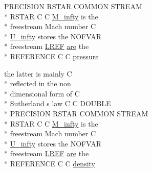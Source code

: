 \begin{DoxyCompactItemize}
P\-R\-E\-C\-I\-S\-I\-O\-N R\-S\-T\-A\-R C\-O\-M\-M\-O\-N S\-T\-R\-E\-A\-M \\*
R\-S\-T\-A\-R C C \hyperlink{msa20_2home_2abonfi_2_c_f_d__codes_2_eul_f_s_83_82_83_2include_2stream_8com_a57c765efd76d44669f6966962bda2d72}{M\-\_\-infty} is the \\*
freestream Mach number C \\*
\hyperlink{msa20_2home_2abonfi_2_c_f_d__codes_2_eul_f_s_83_82_83_2include_2stream_8com_a3306f725a42d6173548f0867aa4313ef}{U\-\_\-infty} stores the N\-O\-F\-V\-A\-R \\*
freestream \hyperlink{msa20_2home_2abonfi_2_c_f_d__codes_2_eul_f_s_83_82_83_2include_2stream_8com_a19d492a15feda819ed49e580c6a1568f}{L\-R\-E\-F} \hyperlink{msa20_2home_2abonfi_2_c_f_d__codes_2_eul_f_s_83_82_83_2include_2ibc8_8com_a7f7721a0bb3c1d35cfbfbcfd6efc1548}{are} the \\*
R\-E\-F\-E\-R\-E\-N\-C\-E C C \hyperlink{home_2abonfi_2_c_f_d__codes_2_eul_f_s_83_84_2include_2stream_8com_a0facbcffae9f2ce2b94119850b5fc3d3}{pressure}
\item 
the latter is mainly C \\*
reflected in the non \\*
dimensional form of C \\*
Sutherland s law C C D\-O\-U\-B\-L\-E \\*
P\-R\-E\-C\-I\-S\-I\-O\-N R\-S\-T\-A\-R C\-O\-M\-M\-O\-N S\-T\-R\-E\-A\-M \\*
R\-S\-T\-A\-R C C \hyperlink{msa20_2home_2abonfi_2_c_f_d__codes_2_eul_f_s_83_82_83_2include_2stream_8com_a57c765efd76d44669f6966962bda2d72}{M\-\_\-infty} is the \\*
freestream Mach number C \\*
\hyperlink{msa20_2home_2abonfi_2_c_f_d__codes_2_eul_f_s_83_82_83_2include_2stream_8com_a3306f725a42d6173548f0867aa4313ef}{U\-\_\-infty} stores the N\-O\-F\-V\-A\-R \\*
freestream \hyperlink{msa20_2home_2abonfi_2_c_f_d__codes_2_eul_f_s_83_82_83_2include_2stream_8com_a19d492a15feda819ed49e580c6a1568f}{L\-R\-E\-F} \hyperlink{msa20_2home_2abonfi_2_c_f_d__codes_2_eul_f_s_83_82_83_2include_2ibc8_8com_a7f7721a0bb3c1d35cfbfbcfd6efc1548}{are} the \\*
R\-E\-F\-E\-R\-E\-N\-C\-E C C \hyperlink{home_2abonfi_2_c_f_d__codes_2_eul_f_s_83_84_2include_2stream_8com_ae3461cde09d7d40d4800995573999b7e}{density}
\end{DoxyCompactItemize}


